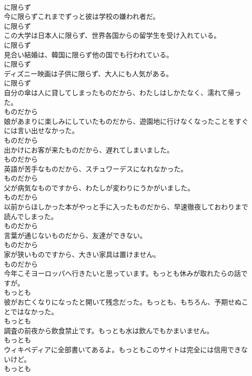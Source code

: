\documentclass[8pt]{extreport}
\begin{document}
\begin{CJK}{UTF8}{min}
\\	に限らず
\\	今に限らずこれまでずっと彼は学校の嫌われ者だ。	
\\	に限らず
\\	この大学は日本人に限らず、世界各国からの留学生を受け入れている。	
\\	に限らず
\\	見合い結婚は、韓国に限らず他の国でも行われている。	
\\	に限らず
\\	ディズニー映画は子供に限らず、大人にも人気がある。	
\\	に限らず
\\	自分の傘は人に貸してしまったものだから、わたしはしかたなく、濡れて帰った。	
\\	ものだから
\\	娘があまりに楽しみにしていたものだから、遊園地に行けなくなったことをすぐには言い出せなかった。	
\\	ものだから
\\	出かけにお客が来たものだから、遅れてしまいました。	
\\	ものだから
\\	英語が苦手なものだから、スチュワーデスになれなかった。	
\\	ものだから
\\	父が病気なものですから、わたしが変わりにうかがいました。	
\\	ものだから
\\	以前からほしかった本がやっと手に入ったものだから、早速徹夜しておわりまで読んでしまった。	
\\	ものだから
\\	言葉が通じないものだから、友達ができない。	
\\	ものだから
\\	家が狭いものですから、大きい家具は置けません。	
\\	ものだから
\\	今年こそヨーロッパへ行きたいと思っています。もっとも休みが取れたらの話ですが。	
\\	もっとも
\\	彼がお亡くなりになったと開いて残念だった。もっとも、もちろん、予期せぬことではなかった。	
\\	もっとも
\\	調査の前夜から飲食禁止です。もっとも水は飲んでもかまいません。	
\\	もっとも
\\	ウィキペディアに全部書いてあるよ。もっともこのサイトは完全には信用できないけど。	
\\	もっとも

\end{CJK}
\end{document}
